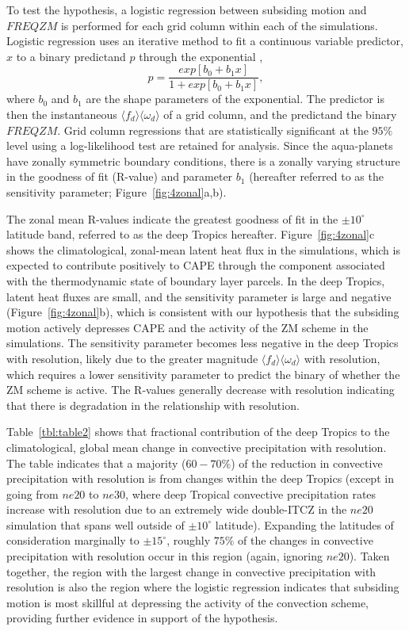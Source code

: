 \documentclass[times]{qjrms4}
\begin{document}
To test the hypothesis, a logistic regression between subsiding motion and $FREQZM$ is performed for each grid column within each of the simulations. Logistic regression uses an iterative method to fit a continuous variable predictor, $x$ to a binary predictand $p$ through the exponential \citep{WILKSBOOK},
\begin{equation}
p = \frac{exp{[b_0 + b_1 x]}}{1 + exp{[b_0 + b_1 x]}}, \label{eq:eq6-3}
\end{equation}
where $b_0$ and $b_1$ are the shape parameters of the exponential. The predictor is then the instantaneous $\langle f_{d} \rangle \langle \omega_{d} \rangle$ of a grid column, and the predictand the binary $FREQZM$. Grid column regressions that are statistically significant at the $95\%$ level using a log-likelihood test \citep{WILKSBOOK} are retained for analysis. Since the aqua-planets have zonally symmetric boundary conditions, there is a zonally varying structure in the goodness of fit (R-value) and parameter $b_1$ (hereafter referred to as the sensitivity parameter; Figure~\ref{fig:4zonal}a,b).

The zonal mean R-values indicate the greatest goodness of fit in the $\pm 10^{\circ}$ latitude band, referred to as the deep Tropics hereafter. Figure~\ref{fig:4zonal}c shows the climatological, zonal-mean latent heat flux in the simulations, which is expected to contribute positively to CAPE through the component associated with the thermodynamic state of boundary layer parcels. In the deep Tropics, latent heat fluxes are small, and the sensitivity parameter is large and negative (Figure~\ref{fig:4zonal}b), which is consistent with our hypothesis that the subsiding motion actively depresses CAPE and the activity of the ZM scheme in the simulations. The sensitivity parameter becomes less negative in the deep Tropics with resolution, likely due to the greater magnitude $\langle f_{d} \rangle \langle \omega_{d} \rangle$ with resolution, which requires a lower sensitivity parameter to predict the binary of whether the ZM scheme is active. The R-values generally decrease with resolution indicating that there is degradation in the relationship with resolution.

Table~\ref{tbl:table2} shows that fractional contribution of the deep Tropics to the climatological, global mean change in convective precipitation with resolution. The table indicates that a majority ($60-70 \%$) of the reduction in convective precipitation with resolution is from changes within the deep Tropics (except in going from $ne20$ to $ne30$, where deep Tropical convective precipitation rates increase with resolution due to an extremely wide double-ITCZ in the $ne20$ simulation that spans well outside of $\pm 10^{\circ}$ latitude). Expanding the latitudes of consideration marginally to $\pm 15^{\circ}$, roughly $75\%$ of the changes in convective precipitation with resolution occur in this region (again, ignoring $ne20$). Taken together, the region with the largest change in convective precipitation with resolution is also the region where the logistic regression indicates that subsiding motion is most skillful at depressing the activity of the convection scheme, providing further evidence in support of the hypothesis.
\end{document}
